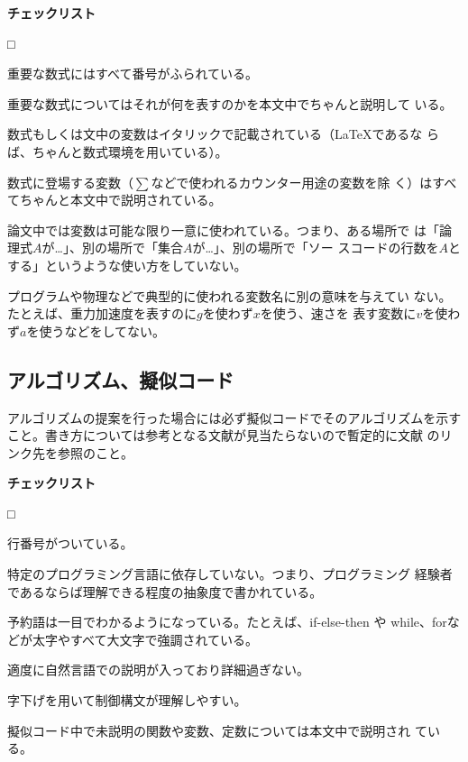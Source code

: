 \documentclass[11pt,a4j]{jsarticle}
\begin{document}
\begin{flushleft}
 {\bf チェックリスト}
\end{flushleft}
\begin{list}%
 {□} %
 {} %
 \item 重要な数式にはすべて番号がふられている。
 \item 重要な数式についてはそれが何を表すのかを本文中でちゃんと説明して
       いる。
 \item 数式もしくは文中の変数はイタリックで記載されている（LaTeXであるな
       らば、ちゃんと数式環境を用いている）。
 \item 数式に登場する変数（$\sum$などで使われるカウンター用途の変数を除
       く）はすべてちゃんと本文中で説明されている。
 \item 論文中では変数は可能な限り一意に使われている。つまり、ある場所で
       は「論理式$A$が…」、別の場所で「集合$A$が…」、別の場所で「ソー
       スコードの行数を$A$とする」というような使い方をしていない。
 \item プログラムや物理などで典型的に使われる変数名に別の意味を与えてい
       ない。たとえば、重力加速度を表すのに$g$を使わず$x$を使う、速さを
       表す変数に$v$を使わず$a$を使うなどをしてない。
\end{list}

\subsection{アルゴリズム、擬似コード}

アルゴリズムの提案を行った場合には必ず擬似コードでそのアルゴリズムを示す
こと。書き方については参考となる文献が見当たらないので暫定的に文献
\cite{Wikipedia.en_Psuedocode}のリンク先を参照のこと。

\begin{flushleft}
 {\bf チェックリスト}
\end{flushleft}
\begin{list}%
 {□} %
 {} %
 \item 行番号がついている。
 \item 特定のプログラミング言語に依存していない。つまり、プログラミング
       経験者であるならば理解できる程度の抽象度で書かれている。
 \item 予約語は一目でわかるようになっている。たとえば、if-else-then や
       while、forなどが太字やすべて大文字で強調されている。
 \item 適度に自然言語での説明が入っており詳細過ぎない。
 \item 字下げを用いて制御構文が理解しやすい。
 \item 擬似コード中で未説明の関数や変数、定数については本文中で説明され
       ている。
\end{list}
\end{document}
